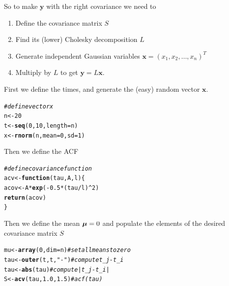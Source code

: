 \documentclass[a4paper, 11pt, amsmath]{article}\usepackage[]{graphicx}\usepackage[]{color}
\makeatletter
\newcommand{\hlnum}[1]{\textcolor[rgb]{0.686,0.059,0.569}{#1}}%
\newcommand{\hlstr}[1]{\textcolor[rgb]{0.192,0.494,0.8}{#1}}%
\newcommand{\hlcom}[1]{\textcolor[rgb]{0.678,0.584,0.686}{\textit{#1}}}%
\newcommand{\hlopt}[1]{\textcolor[rgb]{0,0,0}{#1}}%
\newcommand{\hlstd}[1]{\textcolor[rgb]{0.345,0.345,0.345}{#1}}%
\newcommand{\hlkwa}[1]{\textcolor[rgb]{0.161,0.373,0.58}{\textbf{#1}}}%
\newcommand{\hlkwb}[1]{\textcolor[rgb]{0.69,0.353,0.396}{#1}}%
\newcommand{\hlkwc}[1]{\textcolor[rgb]{0.333,0.667,0.333}{#1}}%
\newcommand{\hlkwd}[1]{\textcolor[rgb]{0.737,0.353,0.396}{\textbf{#1}}}%
\newenvironment{kframe}{%
 \def\at@end@of@kframe{}%
 \ifinner\ifhmode%
  \def\at@end@of@kframe{\end{minipage}}%
  \begin{minipage}{\columnwidth}%
 \fi\fi%
 \def\FrameCommand##1{\hskip\@totalleftmargin \hskip-\fboxsep
 \colorbox{shadecolor}{##1}\hskip-\fboxsep
     \hskip-\linewidth \hskip-\@totalleftmargin \hskip\columnwidth}%
 \MakeFramed {\advance\hsize-\width
   \@totalleftmargin\z@ \linewidth\hsize
   \@setminipage}}%
 {\par\unskip\endMakeFramed%
 \at@end@of@kframe}
\newenvironment{knitrout}{}{} %
\def\bmu{{\mbox{\boldmath $\mu$}}}
\makeatother
\begin{document}
So to make $\mathbf{y}$ with the right covariance we need to 

\begin{enumerate}
\item
Define the covariance matrix $S$
\item
Find its (lower) Cholesky decomposition $L$
\item
Generate independent Gaussian variables $\mathbf{x} = ( x_1, x_2, \ldots, x_n )^T$
\item
Multiply by $L$ to get $\mathbf{y} = L \mathbf{x}$.
\end{enumerate}

First we define the times, and generate the (easy) random vector $\mathbf{x}$.

\begin{knitrout}
\color{fgcolor}\begin{kframe}
\begin{alltt}
\hlcom{# define vector x}
\hlstd{n} \hlkwb{<-} \hlnum{20}
\hlstd{t} \hlkwb{<-} \hlkwd{seq}\hlstd{(}\hlnum{0}\hlstd{,} \hlnum{10}\hlstd{,} \hlkwc{length} \hlstd{= n)}
\hlstd{x} \hlkwb{<-} \hlkwd{rnorm}\hlstd{(n,} \hlkwc{mean} \hlstd{=} \hlnum{0}\hlstd{,} \hlkwc{sd} \hlstd{=} \hlnum{1}\hlstd{)}
\end{alltt}
\end{kframe}
\end{knitrout}

Then we define the ACF 

\begin{knitrout}
\color{fgcolor}\begin{kframe}
\begin{alltt}
\hlcom{# define covariance function}
\hlstd{acv} \hlkwb{<-} \hlkwa{function}\hlstd{(}\hlkwc{tau}\hlstd{,} \hlkwc{A}\hlstd{,} \hlkwc{l}\hlstd{) \{}
  \hlstd{acov} \hlkwb{<-} \hlstd{A} \hlopt{*} \hlkwd{exp}\hlstd{(}\hlopt{-}\hlnum{0.5} \hlopt{*} \hlstd{(tau} \hlopt{/} \hlstd{l)}\hlopt{^}\hlnum{2}\hlstd{)}
  \hlkwd{return}\hlstd{(acov)}
\hlstd{\}}
\end{alltt}
\end{kframe}
\end{knitrout}

Then we define the mean $\bmu = 0$ and  populate the elements of the desired covariance matrix $S$

\begin{knitrout}
\color{fgcolor}\begin{kframe}
\begin{alltt}
\hlstd{mu} \hlkwb{<-} \hlkwd{array}\hlstd{(}\hlnum{0}\hlstd{,} \hlkwc{dim} \hlstd{= n)}    \hlcom{# set all means to zero}
\hlstd{tau} \hlkwb{<-} \hlkwd{outer}\hlstd{(t, t,} \hlstr{"-"}\hlstd{)}    \hlcom{# compute t_j - t_i}
\hlstd{tau} \hlkwb{<-} \hlkwd{abs}\hlstd{(tau)}            \hlcom{# compute |t_j - t_i|}
\hlstd{S} \hlkwb{<-} \hlkwd{acv}\hlstd{(tau,} \hlnum{1.0}\hlstd{,} \hlnum{1.5}\hlstd{)}    \hlcom{# acf(tau) }
\end{alltt}
\end{kframe}
\end{knitrout}
\end{document}
